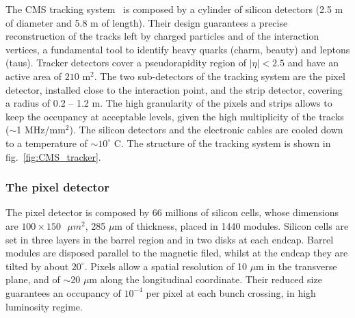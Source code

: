 The CMS tracking system~\cite{Karimäki:368412,Chatrchyan:2014fea} is composed by a cylinder of silicon detectors (2.5 m of diameter and 5.8 m of length). Their design guarantees a precise reconstruction of the tracks left by charged particles and of the interaction vertices, a fundamental tool to identify heavy quarks (charm, beauty) and leptons (taus).
Tracker detectors cover a pseudorapidity region of $|\eta|<2.5$ and have an active area of $210\text{ m}^2$. The two sub-detectors of the tracking system are the pixel detector, installed close to the interaction point, and the strip detector, covering a radius of 0.2 -- 1.2 m. The high granularity of the pixels and strips allows to keep the occupancy at acceptable levels, given the high multiplicity of the tracks ($\sim$1 MHz/$\text{mm}^2$). The silicon detectors and the electronic cables are cooled down to a temperature of $\sim 10^{\circ}$ C. The structure of the tracking system is shown in fig.~\ref{fig:CMS_tracker}.

\subsubsection{The pixel detector}
The pixel detector is composed by 66 millions of silicon cells, whose dimensions are $100 \times 150 \text{ }{\mu{m}}^2$, 285 $\mu$m of thickness, placed in 1440 modules. Silicon cells are set in three layers in the barrel region and in two disks at each endcap. Barrel modules are disposed parallel to the magnetic filed, whilst at the endcap they are tilted by about $20^{\circ}$. 
Pixels allow a spatial resolution of 10 $\mu$m in the transverse plane, and of $\sim$20 $\mu$m along the longitudinal coordinate. Their reduced size guarantees an occupancy of $10^{-4}$ per pixel at each bunch crossing, in high luminosity regime.

